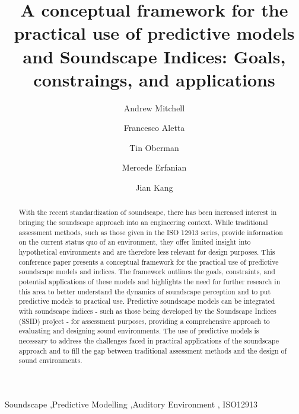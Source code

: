 \documentclass[
  authoryear,
  preprint,
  1p]{elsarticle}
\begin{document}
\begin{frontmatter}
\title{A conceptual framework for the practical use of predictive models
and Soundscape Indices: Goals, constraings, and applications}
\author[1]{Andrew Mitchell%
%
}
\author[1]{Francesco Aletta%
%
}
\author[1]{Tin Oberman%
%
}
\author[1]{Mercede Erfanian%
%
}
\author[1]{Jian Kang%
%
}







        
\begin{abstract}
With the recent standardization of soundscape, there has been increased
interest in bringing the soundscape approach into an engineering
context. While traditional assessment methods, such as those given in
the ISO 12913 series, provide information on the current status quo of
an environment, they offer limited insight into hypothetical
environments and are therefore less relevant for design purposes. This
conference paper presents a conceptual framework for the practical use
of predictive soundscape models and indices. The framework outlines the
goals, constraints, and potential applications of these models and
highlights the need for further research in this area to better
understand the dynamics of soundscape perception and to put predictive
models to practical use. Predictive soundscape models can be integrated
with soundscape indices - such as those being developed by the
Soundscape Indices (SSID) project - for assessment purposes, providing a
comprehensive approach to evaluating and designing sound environments.
The use of predictive models is necessary to address the challenges
faced in practical applications of the soundscape approach and to fill
the gap between traditional assessment methods and the design of sound
environments.
\end{abstract}





\begin{keyword}
    Soundscape \sep Predictive Modelling \sep Auditory Environment \sep 
    ISO12913
\end{keyword}
\end{frontmatter}
    \ifdefined\Shaded\renewenvironment{Shaded}{\begin{tcolorbox}[borderline west={3pt}{0pt}{shadecolor}, breakable, enhanced, boxrule=0pt, interior hidden, sharp corners, frame hidden]}{\end{tcolorbox}}\fi
\end{document}
